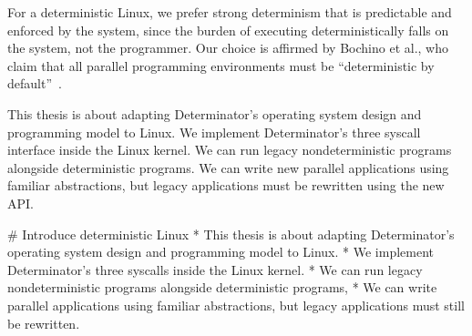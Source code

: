 For a deterministic Linux, we prefer strong determinism
that is predictable and enforced by the system, since the burden of executing
deterministically falls on the system, not the programmer. Our choice is
affirmed by Bochino et al., who claim that all parallel programming environments
must be ``deterministic by default''~\cite{bocchino2009parallel}.

\iffalse

# What kind of determinism do we want?
* Determinism can be provided by special hardware (custom instruction sets),
  specialized programming languages, or the operating system (or a
  combination).
* Environments like DPJ require special programming languages and have limited
  uptake; however, we want to write programs in general-purpose languages.
* Systems like DMP require special hardware support. Again, these systems have
  limited uptake; we want to write programs on widely available/popular CPUs.
* Kendo only enforces scheduling synchronization and is only weakly
  deterministic.
* We prefer strong determinism, because the burden of providing determinism
  falls on the system, not the programmer. Programs run in a strongly
  deterministic environment cannot possibly behave nondeterministically.
* We also want predictability; Kendo's uses a "wait for turn" approach where
  schedule sequences are arbitrary and depend on instruction counting.
* With all of the above aspects, we can write, run, and debug programs knowing
  that output is determined only by program logic.

[MW: above is a bit too much detail for this point in the flow. Why does
reader need to understand DPJ, DMP, etc.? If you can get to Determinator
sooner, or at least foreshadow it, that'd be better. ideally, you're
getting to Determinator in the 3rd or 4th paragraph of the intro (not
later). I think you can do that.]

\fi

This thesis is about adapting Determinator's operating system design and
programming model to Linux. We implement Determinator's three syscall interface
inside the Linux kernel. We can run legacy nondeterministic programs alongside
deterministic programs. We can write new parallel applications using
familiar abstractions, but legacy applications must be rewritten using the new
API.

\iffalse

# Introduce deterministic Linux
* This thesis is about adapting Determinator's operating system design and
  programming model to Linux.
* We implement Determinator's three syscalls inside the Linux kernel.
* We can run legacy nondeterministic programs alongside deterministic programs,
* We can write parallel applications using familiar abstractions, but legacy
  applications must still be rewritten.

